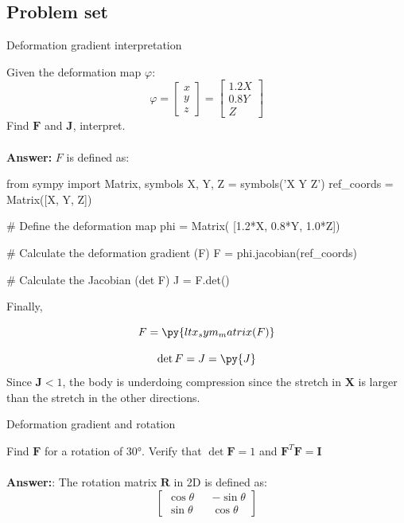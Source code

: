 \subsection{Problem set}

\begin{problem}
    Deformation gradient interpretation
\end{problem}
Given the deformation map $\varphi$:
$$
    \varphi = \begin{bmatrix}
        x \\ y \\ z
    \end{bmatrix} = 
    \begin{bmatrix}
        1.2X \\
        0.8Y \\
        Z
    \end{bmatrix}
$$
Find $\mathbf{F}$ and $\mathbf{J}$, interpret. 
\\\\ \textbf{Answer:} $F$ is defined as:
\begin{pyblock}
from sympy import Matrix, symbols
X, Y, Z = symbols('X Y Z')
ref_coords = Matrix([X, Y, Z])

# Define the deformation map
phi = Matrix(
    [1.2*X,
     0.8*Y,
     1.0*Z])

# Calculate the deformation gradient (F)
F = phi.jacobian(ref_coords)

# Calculate the Jacobian (det F)
J = F.det()
\end{pyblock}
Finally,

$$
    F = \py{ltx_sym_matrix(F)}
$$

$$
    \det{F} = J = \py{J}
$$
Since $\mathbf{J} < 1$, the body is underdoing compression since the stretch in $\mathbf{X}$ is larger than the stretch in the other directions.

\begin{problem}
    Deformation gradient and rotation
\end{problem}
Find $\mathbf{F}$ for a rotation of 30°. Verify that $\det{\mathbf{F}}=1$ and $\mathbf{F}^{T}\mathbf{F}=\mathbf{I}$ 
\\\\ \textbf{Answer:}:
The rotation matrix $\mathbf{R}$ in 2D is defined as:
$$
    \begin{bmatrix}
        \cos \theta && -\sin \theta \\
        \sin \theta && \cos \theta
    \end{bmatrix}
$$

